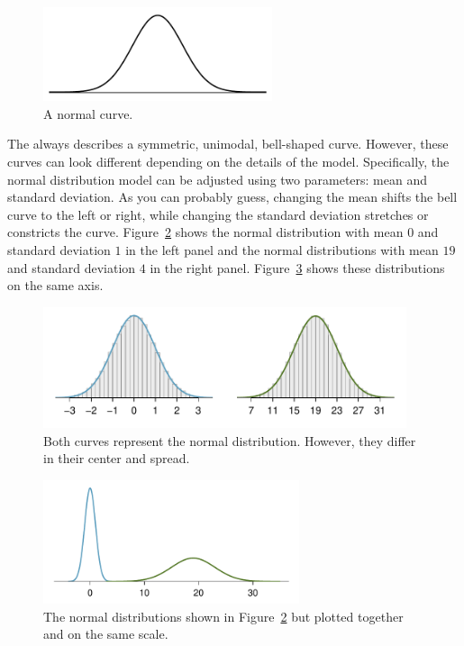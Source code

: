 \begin{figure}[h]
\centering
\includegraphics[width=0.6\textwidth]{ch_distributions/figures/simpleNormal/simpleNormal}
\caption{A normal curve.}
\label{simpleNormal}
\end{figure}


The  always describes a symmetric, unimodal, bell-shaped curve. However, these curves can look different depending on the details of the model. Specifically, the normal distribution model can be adjusted using two parameters: mean and standard deviation. As you can probably guess, changing the mean shifts the bell curve to the left or right, while changing the standard deviation stretches or constricts the curve. 
\newpage
Figure~\ref{twoSampleNormals} shows the normal distribution with mean $0$ and standard deviation $1$ in the left panel and the normal distributions with mean $19$ and standard deviation $4$ in the right panel. Figure~\ref{twoSampleNormalsStacked} shows these distributions on the same axis.


\begin{figure}[hht]
\centering
\includegraphics[width=0.95\textwidth]{ch_distributions/figures/twoSampleNormals/twoSampleNormals}
\caption{Both curves represent the normal distribution.  However, they differ in their center and spread. }
\label{twoSampleNormals}
\end{figure}

\begin{figure}[hht]
\centering
\includegraphics[width=0.67\textwidth]{ch_distributions/figures/twoSampleNormalsStacked/twoSampleNormalsStacked}
\caption{The normal distributions shown in Figure~\ref{twoSampleNormals} but plotted together and on the same scale.}
\label{twoSampleNormalsStacked}
\end{figure}

